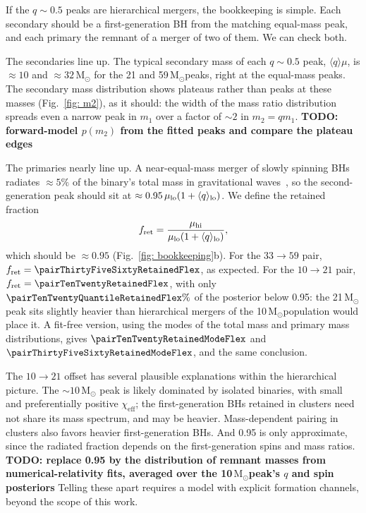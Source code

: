 \documentclass[%
 reprint,
 amsmath,amssymb,
 aps,
 prl,
 nofootinbib,nobibnotes,
 floatfix,
]{revtex4-2}
\newcommand{\Msun}{\ensuremath{\mathrm{M}_{\odot}}}
\newcommand{\chieff}{\ensuremath{\chi_{\mathrm{eff}}}}
\newcommand{\todo}[1]{{\color{Blue}\bf TODO: #1}}
\newcommand{\featTen}{10\xspace}
\newcommand{\featTwenty}{21\xspace}
\newcommand{\featThirtyFive}{33\xspace}
\newcommand{\featSixty}{59\xspace}
\begin{document}
If the $q \sim 0.5$ peaks are hierarchical mergers, the bookkeeping is simple. Each secondary should be a first-generation \ac{BH} from the matching equal-mass peak, and each primary the remnant of a merger of two of them. We can check both.

The secondaries line up. The typical secondary mass of each $q \sim 0.5$ peak, $\langle q \rangle \mu$, is $\approx 10$ and $\approx 32\,\Msun$ for the \featTwenty and \featSixty\,\Msun peaks, right at the equal-mass peaks. The secondary mass distribution shows plateaus rather than peaks at these masses (Fig.~\ref{fig: m2}), as it should: the width of the mass ratio distribution spreads even a narrow peak in $m_1$ over a factor of $\sim 2$ in $m_2 = q m_1$. \todo{forward-model $p(m_2)$ from the fitted peaks and compare the plateau edges}

The primaries nearly line up. A near-equal-mass merger of slowly spinning \acp{BH} radiates $\approx 5\%$ of the binary's total mass in gravitational waves~\cite{Gerosa:2021mno}, so the second-generation peak should sit at $\approx 0.95\,\mu_{\rm lo}(1 + \langle q \rangle_{\rm lo})$. We define the retained fraction
\begin{equation}
    f_{\rm ret} = \frac{\mu_{\rm hi}}{\mu_{\rm lo}(1 + \langle q \rangle_{\rm lo})},
\end{equation}
which should be $\approx 0.95$ (Fig.~\ref{fig: bookkeeping}b). For the $\featThirtyFive \to \featSixty$ pair, $f_{\rm ret} = \pairThirtyFiveSixtyRetainedFlex$, as expected. For the $\featTen \to \featTwenty$ pair, $f_{\rm ret} = \pairTenTwentyRetainedFlex$, with only $\pairTenTwentyQuantileRetainedFlex\%$ of the posterior below 0.95: the \featTwenty\,\Msun peak sits slightly heavier than hierarchical mergers of the \featTen\,\Msun population would place it. A fit-free version, using the modes of the total mass and primary mass distributions, gives $\pairTenTwentyRetainedModeFlex$ and $\pairThirtyFiveSixtyRetainedModeFlex$, and the same conclusion.

The $\featTen \to \featTwenty$ offset has several plausible explanations within the hierarchical picture. The $\sim \featTen\,\Msun$ peak is likely dominated by isolated binaries, with small and preferentially positive $\chieff$; the first-generation \acp{BH} retained in clusters need not share its mass spectrum, and may be heavier. Mass-dependent pairing in clusters also favors heavier first-generation \acp{BH}. And 0.95 is only approximate, since the radiated fraction depends on the first-generation spins and mass ratios. \todo{replace 0.95 by the distribution of remnant masses from numerical-relativity fits, averaged over the \featTen\,\Msun peak's $q$ and spin posteriors} Telling these apart requires a model with explicit formation channels, beyond the scope of this work.
\end{document}
